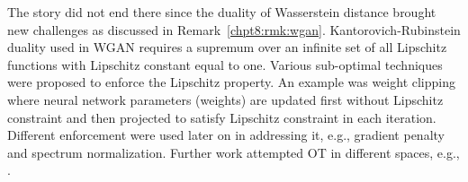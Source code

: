 The story did not end there since the duality of Wasserstein distance brought new challenges as discussed in Remark~\ref{chpt8:rmk:wgan}.
Kantorovich-Rubinstein duality used in WGAN requires a supremum over
an infinite set of all Lipschitz functions with Lipschitz constant equal
to one. Various sub-optimal techniques were proposed to enforce the
Lipschitz property. An example was weight clipping
\cite{2017arXiv170107875A} where neural network parameters (weights)
are updated first without Lipschitz constraint and then projected to
satisfy Lipschitz constraint in each iteration. Different enforcement were used later on in addressing it, e.g., gradient penalty\cite{2017arXiv170400028G} and spectrum normalization\cite{2018arXiv180205957M}. Further work attempted OT in different spaces, e.g., \cite{gemici2018primaldual, adler2018banach}.


